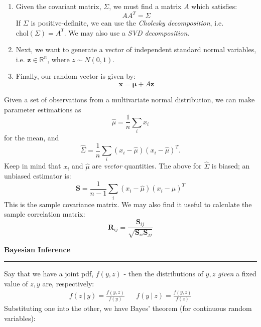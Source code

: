 \documentclass[12pt]{article}
\newcommand{\minisection}[1]{
    \par\vspace{0.25cm}
    \textbf{#1}\par
    \vspace{0.1cm}
    \hrule
    \vspace{0.25cm}
}
\begin{document}
    \begin{enumerate}
        \item Given the covariant matrix, $\Sigma$, we must find a matrix $A$ which satisfies:
        \begin{equation*}
            AA^T = \Sigma
        \end{equation*}
        If $\Sigma$ is positive-definite, we can use the \textit{Cholesky decomposition}, i.e. $\text{chol}(\Sigma) = A^T$. We may also use a \textit{SVD decomposition}. 
        \item Next, we want to generate a vector of independent standard normal variables, i.e. $\bm z\in \mathbb R^n$, where $z\sim N(0,1)$.
        \item Finally, our random vector is given by:
        \begin{equation*}
            \bm x = \bm\mu+A\bm z
        \end{equation*}
    \end{enumerate}
    Given a set of observations from a multivariate normal distribution, we can make parameter estimations as
    \begin{equation*}
        \hat\mu = \frac 1n\sum_ix_i
    \end{equation*}
    for the mean, and
    \begin{equation*}
        \hat\Sigma = \frac 1n\sum_i (x_i - \hat\mu)(x_i - \hat\mu)^T.
    \end{equation*}
    Keep in mind that $x_i$ and $\hat\mu$ are \textit{vector} quantities. The above for $\hat\Sigma$ is biased; an unbiased estimator is:
    \begin{equation*}
        \bm S = \frac{1}{n-1}\sum_i(x_i-\hat\mu)(x_i-\hat\mu)^T
    \end{equation*}
    This is the sample covariance matrix. We may also find it useful to calculate the sample correlation matrix:
    \begin{equation*}
        \bm R_{ij} = \frac{\bm S_{ij}}{\sqrt{\bm S_{ii}\bm S_{jj}}}
    \end{equation*}
    \minisection{Bayesian Inference}
    Say that we have a joint pdf, $f(y,z)$ - then the distributions of $y,z$ \textit{given} a fixed value of $z,y$ are, respectively:
    \begin{align*}
        f(z\ |\ y) = \frac{f(y,z)}{f(y)} && f(y\ |\ z) = \frac{f(y,z)}{f(z)}
    \end{align*}
    Substituting one into the other, we have Bayes' theorem (for continuous random variables):
\end{document}

